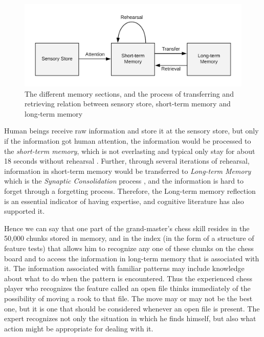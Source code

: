 \begin{figure}
\includegraphics[width = 1\columnwidth]{memory_store.png}
\centering
\caption{The different memory sections, and the process of transferring and retrieving relation between sensory store, short-term memory and long-term memory}
\label{memoryStore}
\end{figure}

Human beings receive raw information and store it at the sensory store, but only if the information got human attention, the information would be processed to the \textit{short-term memory}, which is not everlasting and typical only stay for about 18 seconds without rehearsal \cite{revlin2012cognition}. Further, through several iterations of rehearsal, information in short-term memory would be transferred to \textit{Long-term Memory} which is the \textit{Synaptic Consolidation} process \cite{dudai2004memory}, and the information is hard to forget through a forgetting process. Therefore, the Long-term memory reflection is an essential indicator of having expertise, and cognitive literature has also supported it. 

\begin{displayquote}
Hence we can say that one part of the grand-master's chess skill resides in the 50,000 chunks stored in memory, and in the index (in the form of a structure of feature tests) that allows him to recognize any one of these chunks on the chess board and to access the information in long-term memory that is associated with it. The information associated with familiar patterns may include knowledge about what to do when the pattern is encountered. Thus the experienced chess player who recognizes the feature called an open file thinks immediately of the possibility of moving a rook to that file. The move may or may not be the best one, but it is one that should be considered whenever an open file is present. The expert recognizes not only the situation in which he finds himself, but also what action might be appropriate for dealing with it.
\end{displayquote}

